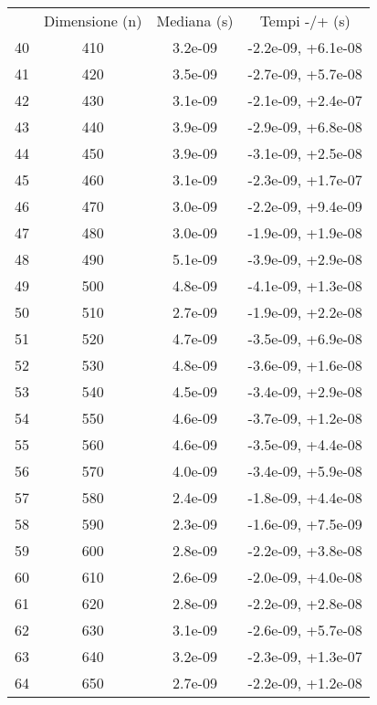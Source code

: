 \begin{table}
\centering
\begin{adjustbox}{width=1\textwidth/2}
\begin{tabular}{|c|c|c|c|}
\hline
 & Dimensione (n) & Mediana (s) & Tempi -/+ (s) \\
40 & 410 & 3.2e-09 & -2.2e-09, +6.1e-08 \\
\cline{1-4}
41 & 420 & 3.5e-09 & -2.7e-09, +5.7e-08 \\
\cline{1-4}
42 & 430 & 3.1e-09 & -2.1e-09, +2.4e-07 \\
\cline{1-4}
43 & 440 & 3.9e-09 & -2.9e-09, +6.8e-08 \\
\cline{1-4}
44 & 450 & 3.9e-09 & -3.1e-09, +2.5e-08 \\
\cline{1-4}
45 & 460 & 3.1e-09 & -2.3e-09, +1.7e-07 \\
\cline{1-4}
46 & 470 & 3.0e-09 & -2.2e-09, +9.4e-09 \\
\cline{1-4}
47 & 480 & 3.0e-09 & -1.9e-09, +1.9e-08 \\
\cline{1-4}
48 & 490 & 5.1e-09 & -3.9e-09, +2.9e-08 \\
\cline{1-4}
49 & 500 & 4.8e-09 & -4.1e-09, +1.3e-08 \\
\cline{1-4}
50 & 510 & 2.7e-09 & -1.9e-09, +2.2e-08 \\
\cline{1-4}
51 & 520 & 4.7e-09 & -3.5e-09, +6.9e-08 \\
\cline{1-4}
52 & 530 & 4.8e-09 & -3.6e-09, +1.6e-08 \\
\cline{1-4}
53 & 540 & 4.5e-09 & -3.4e-09, +2.9e-08 \\
\cline{1-4}
54 & 550 & 4.6e-09 & -3.7e-09, +1.2e-08 \\
\cline{1-4}
55 & 560 & 4.6e-09 & -3.5e-09, +4.4e-08 \\
\cline{1-4}
56 & 570 & 4.0e-09 & -3.4e-09, +5.9e-08 \\
\cline{1-4}
57 & 580 & 2.4e-09 & -1.8e-09, +4.4e-08 \\
\cline{1-4}
58 & 590 & 2.3e-09 & -1.6e-09, +7.5e-09 \\
\cline{1-4}
59 & 600 & 2.8e-09 & -2.2e-09, +3.8e-08 \\
\cline{1-4}
60 & 610 & 2.6e-09 & -2.0e-09, +4.0e-08 \\
\cline{1-4}
61 & 620 & 2.8e-09 & -2.2e-09, +2.8e-08 \\
\cline{1-4}
62 & 630 & 3.1e-09 & -2.6e-09, +5.7e-08 \\
\cline{1-4}
63 & 640 & 3.2e-09 & -2.3e-09, +1.3e-07 \\
\cline{1-4}
64 & 650 & 2.7e-09 & -2.2e-09, +1.2e-08 \\

\end{tabular}
\end{adjustbox}
\end{table}
